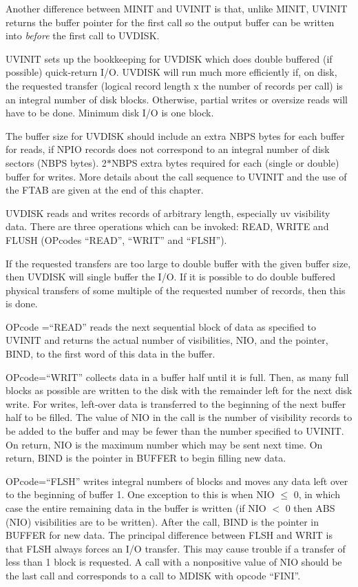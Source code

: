 Another difference between MINIT and UVINIT is that, unlike MINIT,
UVINIT returns the buffer pointer for the first call so the output
buffer can be written into {\it before}  the first call to UVDISK.

UVINIT sets up the bookkeeping for UVDISK which does double buffered
(if possible) quick-return I/O. UVDISK will run much more efficiently
if, on disk, the requested transfer (logical record length x the number
of records per call) is an integral number of disk blocks.  Otherwise,
partial writes or oversize reads will have to be done. Minimum disk
I/O is one block.

The buffer size for UVDISK should include an extra NBPS bytes for
each buffer for reads, if NPIO records does not correspond to an
integral number of disk sectors (NBPS bytes). 2$\ast$NBPS extra bytes
required for each (single or double) buffer for writes.  More details
about the call sequence to UVINIT and the use of the FTAB are given
at the end of this chapter.

UVDISK reads and writes records of arbitrary length, especially uv
visibility data. There are three operations which can be invoked:
READ, WRITE and FLUSH (OPcodes ``READ'', ``WRIT'' and ``FLSH'').

If the requested transfers are too large to double buffer with the
given buffer size, then UVDISK will single buffer the I/O.  If it is
possible to do double buffered physical transfers of some multiple of
the requested number of records, then this is done.

OPcode =``READ'' reads the next sequential block of data as specified to
UVINIT and returns the actual number of visibilities, NIO, and the
pointer, BIND, to the first word of this data in the buffer.

OPcode=``WRIT'' collects data in a buffer half until it is full. Then,
as many full blocks as possible are written to the disk with the
remainder left for the next disk write. For writes, left-over data is
transferred to the beginning of the next buffer half to be filled.
The value of NIO in the call is the number of visibility records to be
added to the buffer and may be fewer than the number specified to
UVINIT.  On return, NIO is the maximum number which may be sent next
time.  On return, BIND is the pointer in BUFFER to begin filling new
data.

OPcode=``FLSH'' writes integral numbers of blocks and moves any data
left over to the beginning of buffer 1.  One exception to this is when
NIO $\le$ 0, in which case the entire remaining data in the
buffer is written (if NIO $<$ 0 then ABS (NIO) visibilities are to
be written).  After the call, BIND is the pointer in BUFFER for
new data. The principal difference between FLSH and WRIT is that FLSH
always forces an I/O transfer.  This may cause trouble if a transfer
of less than 1 block is requested.  A call with a nonpositive value of
NIO should be the last call and corresponds to a call to MDISK with
opcode ``FINI''.

